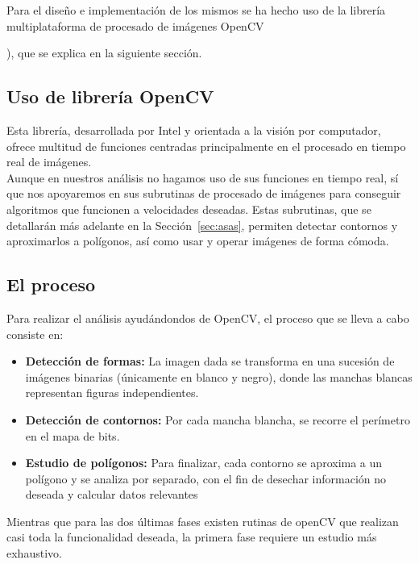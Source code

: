 Para el diseño e implementación de los mismos se ha hecho uso de la librería multiplataforma de procesado de imágenes OpenCV {\cite{opencvDoc}), que se explica en la siguiente sección.

\subsection{Uso de librería OpenCV}

Esta librería, desarrollada por Intel y orientada a la visión por computador, ofrece multitud de funciones centradas principalmente en el procesado en tiempo real de imágenes.\\

Aunque en nuestros análisis no hagamos uso de sus funciones en tiempo real, sí que nos apoyaremos en sus subrutinas de procesado de imágenes para conseguir algoritmos que funcionen a velocidades deseadas. Estas subrutinas, que se detallarán más adelante en la Sección~\ref{sec:asas}, permiten detectar contornos y aproximarlos a polígonos, así como usar y operar imágenes de forma cómoda.\\

\subsection{El proceso}

Para realizar el análisis ayudándondos de OpenCV, el proceso que se lleva a cabo consiste en:

\begin{itemize}

	\item \textbf{Detección de formas:} La imagen dada se transforma en una sucesión de imágenes binarias (únicamente en blanco y negro), donde las manchas blancas representan figuras independientes.
	
	\item\textbf{Detección de contornos:} Por cada mancha blancha, se recorre el perímetro en el mapa de bits.
	
	\item\textbf{Estudio de polígonos:} Para finalizar, cada contorno se aproxima a un polígono y se analiza por separado, con el fin de desechar información no deseada y calcular datos relevantes
	
\end{itemize}

	Mientras que para las dos últimas fases existen rutinas de openCV que realizan casi toda la funcionalidad deseada, la primera fase requiere un estudio más exhaustivo.\\
	
}
